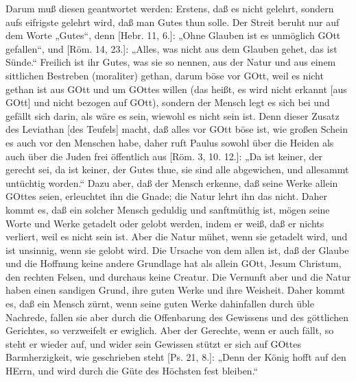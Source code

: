 Darum muß diesen geantwortet werden: Erstens, daß es nicht gelehrt, sondern aufs eifrigste gelehrt wird, daß man Gutes thun solle. Der Streit beruht nur auf dem Worte „Gutes“, denn [Hebr. 11, 6.]: „Ohne Glauben ist es unmöglich GOtt gefallen“, und [Röm. 14, 23.]: „Alles, was nicht aus dem Glauben gehet, das ist Sünde.“ Freilich ist ihr Gutes, was sie so nennen, aus der Natur und aus einem sittlichen Bestreben (moraliter) gethan, darum böse vor GOtt, weil es nicht gethan ist aus GOtt und um GOttes willen (das heißt, es wird nicht erkannt [aus GOtt] und nicht bezogen auf GOtt), sondern der Mensch legt es sich bei und gefällt sich darin, als wäre es sein, wiewohl es nicht sein ist. Denn dieser Zusatz des Leviathan [des Teufels] macht, daß alles vor GOtt böse ist, wie großen Schein es auch vor den Menschen habe, daher ruft Paulus sowohl über die Heiden als auch über die Juden frei öffentlich aus [Röm. 3, 10. 12.]: „Da ist keiner, der gerecht sei, da ist keiner, der Gutes thue, sie sind alle abgewichen, und allesammt untüchtig worden.“ Dazu aber, daß der Mensch erkenne, daß seine Werke allein GOttes seien, erleuchtet ihn die Gnade; die Natur lehrt ihn das nicht. Daher kommt es, daß ein solcher Mensch geduldig und sanftmüthig ist, mögen seine Worte und Werke getadelt oder gelobt werden, indem er weiß, daß er nichts verliert, weil es nicht sein ist. Aber die Natur mühet, wenn sie getadelt wird, und ist unsinnig, wenn sie gelobt wird. Die Ursache von dem allen ist, daß der Glaube und die Hoffnung keine andere Grundlage hat als allein GOtt, Jesum Christum, den rechten Felsen, und durchaus keine Creatur. Die Vernunft aber und die Natur haben einen sandigen Grund, ihre guten Werke und ihre Weisheit. Daher kommt es, daß ein Mensch zürnt, wenn seine guten Werke dahinfallen durch üble Nachrede, fallen sie aber durch die Offenbarung des Gewissens und des göttlichen Gerichtes, so verzweifelt er ewiglich. Aber der Gerechte, wenn er auch fällt, so steht er wieder auf, und wider sein Gewissen stützt er sich auf GOttes Barmherzigkeit, wie geschrieben steht [Ps. 21, 8.]: „Denn der König hofft auf den HErrn, und wird durch die Güte des Höchsten fest bleiben.“

